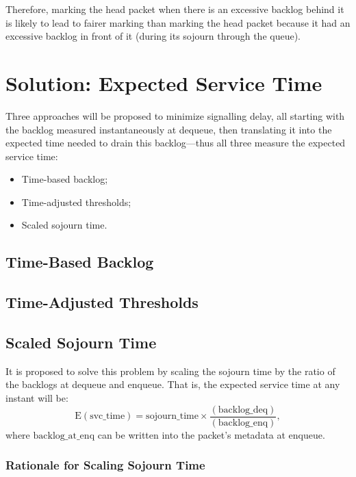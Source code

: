 Therefore, marking the head packet when there is an excessive backlog behind it is likely to lead to fairer marking than marking the head packet because it had an excessive backlog in front of it (during its sojourn through the queue). 

\section{Solution: Expected Service Time}\label{sec:exp_svc_time}

Three approaches will be proposed to minimize signalling delay, all starting with the backlog measured instantaneously at dequeue, then translating it into the expected time needed to drain this backlog---thus all three measure the expected service time:
\begin{itemize}[nosep]
	\item Time-based backlog;
	\item Time-adjusted thresholds;
	\item Scaled sojourn time.
\end{itemize}

\subsection{Time-Based Backlog}\label{sec:time-based_backlog}

\subsection{Time-Adjusted Thresholds}\label{sec:time-adj_thresh}

\subsection{Scaled Sojourn Time}\label{sec:scaled_svc_time}

It is proposed to solve this problem by scaling the sojourn time by the ratio of the backlogs at dequeue and enqueue. That is, the expected service time at any instant will be:
\[\mathrm{E(svc\_time)} = \mathrm{sojourn\_time} \times \frac{\mathrm{(backlog\_deq)}}{\mathrm{(backlog\_enq)}},\]
where \(\mathrm{backlog\_at\_enq}\) can be written into the packet's metadata at enqueue.

\subsubsection{Rationale for Scaling Sojourn Time}\label{sec:inst_svc_time_justify}

